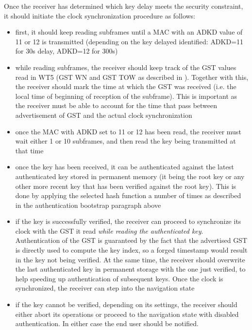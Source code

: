 Once the receiver has determined which key delay meets the security constraint,
it should initiate the clock synchronization procedure as follows:
\begin{itemize}
  \item first, it should keep reading subframes until a MAC with an ADKD value
    of 11 or 12 is transmitted (depending on the key delayed identified:
    \textrm{ADKD=11} for \num{30}\si{s} delay, \textrm{ADKD=12} for
    \num{300}\si{s})
  \item while reading subframes, the receiver should keep track of the GST
    values read in WT5 (GST WN and GST TOW as described in \cite{galileoicd}).
    Together with this, the receiver should mark the time at which the GST was
    received (i.e. the local time of beginning of reception of the subframe).
    This is important as the receiver must be able to account for the time that
    pass between advertisement of GST and the actual clock synchronization
  \item once the MAC with ADKD set to 11 or 12 has been read, the receiver must
    wait either 1 or 10 subframes, and then read the key being transmitted at
    that time
  \item once the key has been received, it can be authenticated against the
    latest authenticated key stored in permanent memory (it being the root key
    or any other more recent key that has been verified against the root key).
    This is done by applying the selected hash function a number of times as
    described in the authentication bootstrap paragraph above
  \item if the key is successfully verified, the receiver can proceed to
    synchronize its clock with the GST it read \textit{while reading the
    authenticated key}. Authentication of the GST is guaranteed by the fact that
    the advertised GST is directly used to compute the key index, so a forged
    timestamp would result in the key not being verified. At the same time, the
    receiver should overwrite the last authenticated key in permanent storage
    with the one just verified, to help speeding up authentication of subsequent
    keys. Once the clock is synchronized, the receiver can step into the
    navigation state
  \item if the key cannot be verified, depending on its settings, the receiver
    should either abort its operations or proceed to the navigation state with
    disabled authentication. In either case the end user should be notified.
\end{itemize}

